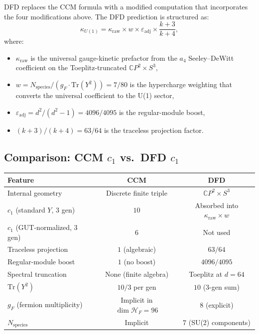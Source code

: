 \documentclass[12pt,a4paper]{article}
\begin{document}
DFD replaces the CCM formula with a modified computation that incorporates
the four modifications above.  The DFD prediction is structured as:
\begin{equation}\label{eq:kappa-dfd}
\boxed{
\kappa_{U(1)} = \kappa_{\mathrm{raw}} \times w
\times \varepsilon_{\mathrm{adj}} \times \frac{k+3}{k+4},
}
\end{equation}
where:
\begin{itemize}
\item $\kappa_{\mathrm{raw}}$ is the universal gauge-kinetic prefactor from
  the $a_4$ Seeley--DeWitt coefficient on the Toeplitz-truncated
  $\mathbb{C}P^2 \times S^3$,
\item $w = N_{\mathrm{species}}/(g_F \cdot \mathrm{Tr}(Y^2)) = 7/80$ is the
  hypercharge weighting that converts the universal coefficient to the U(1)
  sector,
\item $\varepsilon_{\mathrm{adj}} = d^2/(d^2-1) = 4096/4095$ is the
  regular-module boost,
\item $(k+3)/(k+4) = 63/64$ is the traceless projection factor.
\end{itemize}

\subsection{Comparison: CCM $c_1$ vs.\ DFD $c_1$}

\begin{center}
\renewcommand{\arraystretch}{1.4}
\begin{tabular}{p{4cm}cc}
\toprule
\textbf{Feature} & \textbf{CCM} & \textbf{DFD} \\
\midrule
Internal geometry & Discrete finite triple & $\mathbb{C}P^2 \times S^3$ \\
$c_1$ (standard $Y$, 3 gen) & $10$ & Absorbed into $\kappa_{\mathrm{raw}} \times w$ \\
$c_1$ (GUT-normalized, 3 gen) & $6$ & Not used \\
Traceless projection & $1$ (algebraic) & $63/64$ \\
Regular-module boost & $1$ (no boost) & $4096/4095$ \\
Spectral truncation & None (finite algebra) & Toeplitz at $d = 64$ \\
$\mathrm{Tr}(Y^2)$ & $10/3$ per gen & $10$ (3-gen sum) \\
$g_F$ (fermion multiplicity) & Implicit in $\dim\mathcal{H}_F = 96$ & $8$ (explicit) \\
$N_{\mathrm{species}}$ & Implicit & $7$ (SU(2) components) \\
\bottomrule
\end{tabular}
\end{center}
\end{document}

